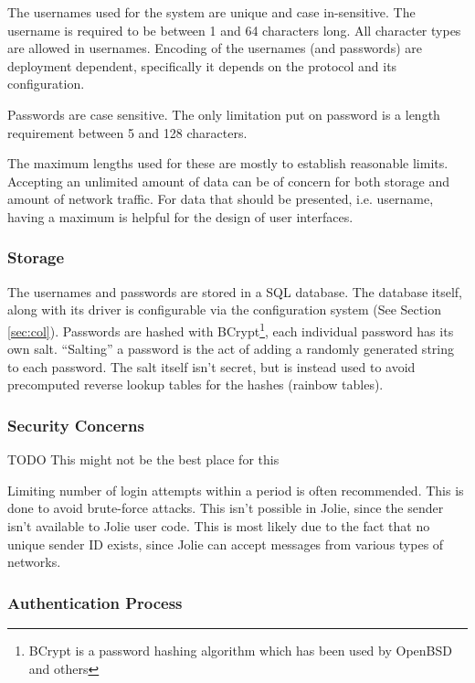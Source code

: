 The usernames used for the system are unique and case in-sensitive. The
username is required to be between 1 and 64 characters long. All character
types are allowed in usernames. Encoding of the usernames (and passwords) are
deployment dependent, specifically it depends on the protocol and its
configuration.

Passwords are case sensitive. The only limitation put on password is a length
requirement between 5 and 128 characters.

The maximum lengths used for these are mostly to establish reasonable limits.
Accepting an unlimited amount of data can be of concern for both storage and
amount of network traffic. For data that should be presented, i.e. username,
having a maximum is helpful for the design of user interfaces.

\subsubsection*{Storage}

The usernames and passwords are stored in a SQL database. The database itself,
along with its driver is configurable via the configuration system (See
Section \ref{sec:col}). Passwords are hashed with
BCrypt\footnote{BCrypt is a password hashing algorithm which has been used
by OpenBSD and others}\cite{provos1999future}, each individual password has
its own salt. ``Salting'' a password is the act of adding a randomly
generated string to each password. The salt itself isn't secret,
but is instead used to avoid precomputed reverse lookup tables for
the hashes (rainbow tables).

\subsubsection*{Security Concerns}

TODO This might not be the best place for this

Limiting number of login attempts within a period is often recommended. This is
done to avoid brute-force attacks. This isn't possible in Jolie, since the
sender isn't available to Jolie user code. This is most likely due to the fact
that no unique sender ID exists, since Jolie can accept messages from various
types of networks.

\subsubsection*{Authentication Process}

